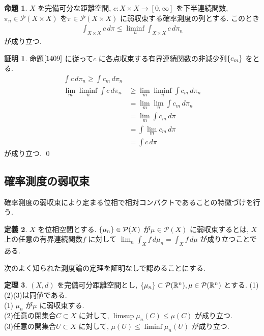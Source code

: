 \documentclass[10pt, fleqn, label-section=none, titlepage]{bxjsarticle}
\theoremstyle{definition}
\newtheorem{dfn}{定義}[section]
\newtheorem{prop}[dfn]{命題}
\newtheorem{thm}[dfn]{定理}
\newtheorem*{pf*}{証明}
\newcommand{\cbra}[1]{\mleft\{#1\mright\}}
\newcommand{\Rn}{\mathbb{R}^n}
\renewcommand{\;}{\, ; \,}
\renewcommand{\d}{\, {d}}
\begin{document}
\begin{prop}
\label{1807}
$X$ を完備可分な距離空間, $c: X \times X \rightarrow [0, \infty]$ を下半連続関数, $\pi_n \in \mathcal P (X \times X)$ を$\pi \in \mathcal P (X \times X)$ に弱収束する確率測度の列とする. このとき
\begin{align*} \int _{X \times X} c \d \pi \leq \liminf_n \int_{X\times X} c \d \pi_n \end{align*}
が成り立つ.
\end{prop}
\begin{pf*}
命題$\ref{1409}$ に従って$c$ に各点収束する有界連続関数の非減少列$\cbra{c_m}$ をとる.
\begin{align*} \int c \d\pi_n \geq \int c_m \d \pi_n \\
\lim_m \liminf_n \int c \d\pi_n &\geq \lim_m \liminf_n \int c_m \d\pi _n \\
&= \lim_m \lim_n \int c_m \d\pi_n \\
&= \lim_m \int c_m \d\pi\\
&= \int \lim_m c_m \d\pi \\
&= \int c \d\pi
\end{align*}
が成り立つ.
\qed
\end{pf*}


\subsection{確率測度の弱収束}

確率測度の弱収束により定まる位相で相対コンパクトであることの特徴づけを行う.

\begin{dfn}
$X$ を位相空間とする. $\cbra{\mu_n} \in \mathcal{P}(X)$ が$\mu \in \mathcal{P}(X)$ に弱収束するとは, $X$ 上の任意の有界連続関数$f$ に対して $\lim_n \int_X f \d \mu_n = \int_X f \d \mu$ が成り立つことである.
\end{dfn}

次のよく知られた測度論の定理を証明なしで認めることにする.

\begin{thm}
$(X,d)$ を完備可分距離空間とし, $\cbra{\mu_n} \subset \mathcal{P} (\Rn), \mu \in \mathcal{P}(\Rn) $ とする. (1)(2)(3)は同値である. \\
(1) $\mu_n $ が$ \mu $ に弱収束する.\\
(2)任意の閉集合$C \subset X$ に対して, $\limsup \mu_n (C) \leq \mu (C) $ が成り立つ. \\
(3)任意の開集合$U \subset X$ に対して, $\mu (U) \leq \liminf \mu_n (U)$ が成り立つ.

\end{thm}
\end{document}
